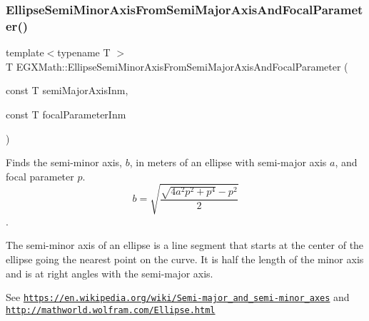 \mbox{\label{group___e_g_x_math-_geometry-2_d-_ellipse-_semi_minor_axis_ga49cd1c9a110ae740e606d1f012edf037}} 
\subsubsection{\texorpdfstring{Ellipse\+Semi\+Minor\+Axis\+From\+Semi\+Major\+Axis\+And\+Focal\+Parameter()}{EllipseSemiMinorAxisFromSemiMajorAxisAndFocalParameter()}}
{\footnotesize\ttfamily template$<$typename T $>$ \\
T E\+G\+X\+Math\+::\+Ellipse\+Semi\+Minor\+Axis\+From\+Semi\+Major\+Axis\+And\+Focal\+Parameter (\begin{DoxyParamCaption}\item[{const T}]{semi\+Major\+Axis\+Inm,  }\item[{const T}]{focal\+Parameter\+Inm }\end{DoxyParamCaption})}



Finds the semi-\/minor axis, $b$, in meters of an ellipse with semi-\/major axis $a$, and focal parameter $p$. \[ b=\sqrt{\dfrac{\sqrt{4 a^2 p^2 + p^4}-p^2}{2}} \]. 

The semi-\/minor axis of an ellipse is a line segment that starts at the center of the ellipse going the nearest point on the curve. It is half the length of the minor axis and is at right angles with the semi-\/major axis.

See \href{https://en.wikipedia.org/wiki/Semi-major_and_semi-minor_axes}{\tt https\+://en.\+wikipedia.\+org/wiki/\+Semi-\/major\+\_\+and\+\_\+semi-\/minor\+\_\+axes} and \href{http://mathworld.wolfram.com/Ellipse.html}{\tt http\+://mathworld.\+wolfram.\+com/\+Ellipse.\+html}


